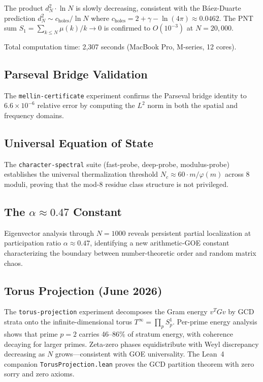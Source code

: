 \documentclass[11pt,a4paper]{article}
\begin{document}
The product $d_N^2 \cdot \ln N$ is slowly decreasing, consistent with
the B\'aez-Duarte prediction $d_N^2 \sim c_{\mathrm{holes}}/\ln N$
where $c_{\mathrm{holes}} = 2 + \gamma - \ln(4\pi) \approx 0.0462$.
The PNT sum $S_1 = \sum_{k \leq N} \mu(k)/k \to 0$ is confirmed
to $O(10^{-3})$ at $N = 20{,}000$.

Total computation time: 2{,}307 seconds (MacBook Pro, M-series, 12 cores).

\subsection{Parseval Bridge Validation}

The \texttt{mellin-certificate} experiment confirms the Parseval
bridge identity to $6.6 \times 10^{-6}$ relative error by computing
the $L^2$ norm in both the spatial and frequency domains.

\subsection{Universal Equation of State}

The \texttt{character-spectral} suite (fast-probe, deep-probe,
modulus-probe) establishes the universal thermalization threshold
$N_c \approx 60 \cdot m/\varphi(m)$ across 8 moduli, proving that
the mod-8 residue class structure is not privileged.

\subsection{The $\alpha \approx 0.47$ Constant}

Eigenvector analysis through $N = 1000$ reveals persistent partial
localization at participation ratio $\alpha \approx 0.47$, identifying
a new arithmetic-GOE constant characterizing the boundary between
number-theoretic order and random matrix chaos.

\subsection{Torus Projection (June 2026)}

The \texttt{torus-projection} experiment decomposes the Gram energy
$v^T G v$ by GCD strata onto the infinite-dimensional torus
$T^\infty = \prod_p S^1_p$. Per-prime energy analysis shows that
prime $p = 2$ carries 46--86\% of stratum energy, with coherence
decaying for larger primes. Zeta-zero phases equidistribute with
Weyl discrepancy decreasing as $N$ grows---consistent with GOE
universality. The Lean~4 companion \texttt{TorusProjection.lean}
proves the GCD partition theorem with zero sorry and zero axioms.
\end{document}
